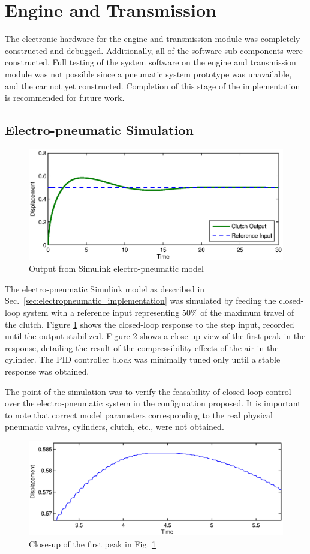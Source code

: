\section{Engine and Transmission}

The electronic hardware for the engine and transmission module was completely constructed and debugged. Additionally, all of the software sub-components were constructed. Full testing of the system software on the engine and transmission module was not possible since a pneumatic system prototype was unavailable, and the car not yet constructed. Completion of this stage of the implementation is recommended for future work.

\subsection{Electro-pneumatic Simulation}

\begin{figure}[tb]
 \centering
 \includegraphics[width=5in,keepaspectratio]{results/figures/electro-pneumatic_simulation_plot.eps}
 \caption{Output from Simulink electro-pneumatic model}
 \label{fig:pneumatic_sim}
\end{figure}

The electro-pneumatic Simulink model as described in Sec.\ \ref{sec:electropneumatic_implementation} was simulated by feeding the closed-loop system with a reference input representing 50\% of the maximum travel of the clutch. Figure \ref{fig:pneumatic_sim} shows the closed-loop response to the step input, recorded until the output stabilized. Figure \ref{fig:pneumatic_sim_zoom} shows a close up view of the first peak in the response, detailing the result of the compressibility effects of the air in the cylinder. The PID controller block was minimally tuned only until a stable response was obtained.

The point of the simulation was to verify the feasability of closed-loop control over the electro-pneumatic system in the configuration proposed. It is important to note that correct model parameters corresponding to the real physical pneumatic valves, cylinders, clutch, etc., were not obtained.

\begin{figure}[tb]
 \centering
 \includegraphics[width=5in,keepaspectratio]{results/figures/electro-pneumatic_simulation_plot2.eps}
 \caption{Close-up of the first peak in Fig. \ref{fig:pneumatic_sim}}
 \label{fig:pneumatic_sim_zoom}
\end{figure}